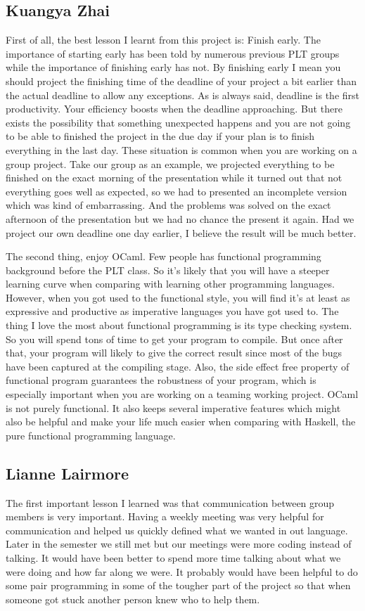 \subsection{Kuangya Zhai}
First of all, the best lesson I learnt from this project is: Finish early. The importance of starting early has been told by numerous previous PLT groups while the importance of finishing early has not. By finishing early I mean you should project the finishing time of the deadline of your project a bit earlier than the actual deadline to allow any exceptions. As is always said, deadline is the first productivity. Your efficiency boosts when the deadline approaching. But there exists the possibility that something unexpected happens and you are not going to be able to finished the project in the due day if your plan is to finish everything in the last day. These situation is common when you are working on a group project. Take our group as an example, we projected everything to be finished on the exact morning of the presentation while it turned out that not everything goes well as expected, so we had to presented an incomplete version which was kind of embarrassing. And the problems was solved on the exact afternoon of the presentation but we had no chance the present it again. Had we project our own deadline one day earlier, I believe the result will be much better. 

The second thing, enjoy OCaml. Few people has functional programming background before the PLT class. So it's likely that you will have a steeper learning curve when comparing with learning other programming languages. However, when you got used to the functional style, you will find it's at least as expressive and productive as imperative languages you have got used to. The thing I love the most about functional programming is its type checking system. So you will spend tons of time to get your program to compile. But once after that, your program will likely to give the correct result since most of the bugs have been captured at the compiling stage. Also, the side effect free property of functional program guarantees the robustness of your program, which is especially important when you are working on a teaming working project. OCaml is not purely functional. It also keeps several imperative features which might also be helpful and make your life much easier when comparing with Haskell, the pure functional programming language. 


\subsection{Lianne Lairmore}
The first important lesson I learned was that communication between group members is very important. Having a weekly meeting 
was very helpful for communication and helped us quickly defined what we wanted in out language. Later in the semester we still
met but our meetings were more coding instead of talking. It would have been better to spend more time talking about what we were 
doing and how far along we were. It probably would have been helpful to do some pair programming in some of the tougher part of the 
project so that when someone got stuck another person knew who to help them. 

